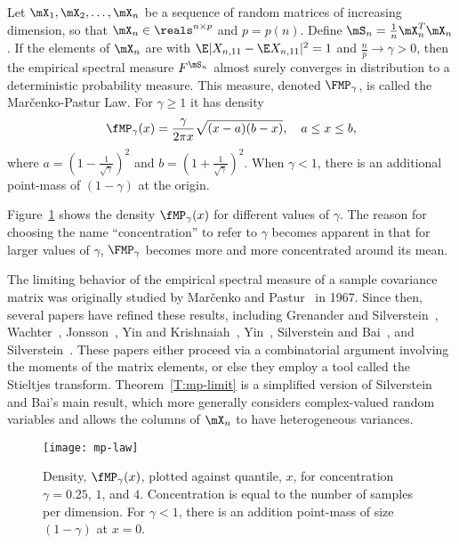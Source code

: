 \begin{theorem}\label{T:mp-limit}
Let $\mX_1, \mX_2, \ldots, \mX_n$ be a sequence of random matrices of increasing dimension, so that $\mX_n \in \reals^{n\times p}$ and $p = p(n)$.
Define $\mS_n = \frac{1}{n} \mX_n^T \mX_n$.  If the elements of $\mX_n$ are \iid with $\E| X_{n,11} - \E X_{n,11} |^2 = 1$ and $\frac{n}{p} \to \gamma > 0$, then the empirical spectral measure $F^{\mS_n}$ almost surely converges in distribution to a deterministic probability measure.  This measure, denoted
$\FMP_\gamma$, is called the Mar\v{c}enko-Pastur Law.  For $\gamma \geq 1$ it
has density
\begin{equation}
    \fMP_\gamma(x)
    =
    \frac{\gamma}{2 \pi x}
    \sqrt{(x - a)(b - x)},
    \quad
    a \leq x \leq b,
\end{equation}
where
\(
    a = \left( 1 - \frac{1}{\sqrt{\gamma}} \right)^2
\)
and
\(
    b = \left( 1 + \frac{1}{\sqrt{\gamma}} \right)^2.
\)
When $\gamma < 1$, there is an additional point-mass of $(1 - \gamma)$ at the origin.
\end{theorem}

\noindent
Figure~\ref{F:mp-law} shows the density $\fMP_\gamma(x)$ for different values
of $\gamma$.  The reason for choosing the name ``concentration'' to refer to $\gamma$ becomes apparent in that for larger values of $\gamma$, $\FMP_\gamma$ becomes more and more concentrated around its mean.

The limiting behavior of the empirical spectral measure of a sample covariance matrix was originally studied by Mar\v{c}enko and Pastur~\cite{marcenko1967des} in 1967.  Since then, several papers have refined these results, including Grenander and Silverstein~\cite{grenander1977san}, Wachter~\cite{wachter1978slr},
 Jonsson~\cite{jonsson1982slt}, Yin and Krishnaiah~\cite{yin1983lte},
Yin~\cite{yin1986lsd}, Silverstein and Bai~\cite{silverstein1995ede}, and
Silverstein~\cite{silverstein1995sce}.  These papers either proceed via a combinatorial argument involving the moments of the matrix elements, or else they employ a tool called the Stieltjes transform.  Theorem~\ref{T:mp-limit} is a simplified version of Silverstein and Bai's main result, which more generally considers complex-valued random variables and allows the columns of $\mX_n$ to have heterogeneous variances.

\begin{figure}
    \centering
    \texttt{[image: mp-law]}
    \caption{
        Density, $\fMP_\gamma(x)$, plotted against quantile, $x$,
        for concentration $\gamma = 0.25$, $1$, and $4$.  Concentration
        is equal to the number of samples per dimension. For $\gamma < 1$,
        there is an addition point-mass of size $(1 - \gamma)$ at $x = 0$.
    }\label{F:mp-law}
\end{figure}

